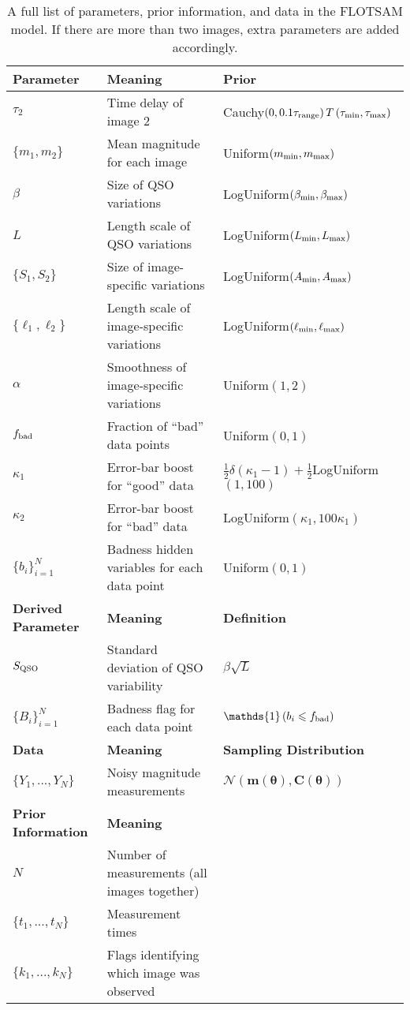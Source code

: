 \documentclass[useAMS,usenatbib, a4paper]{mn2e} \usepackage{natbib}
\newcommand{\params}{\boldsymbol{\theta}}
\begin{document}
\begin{table*}
\begin{tabular}{lll}
\hline
{\bf Parameter} &	{\bf Meaning}			& {\bf Prior}\\
\hline
$\tau_2$	&	Time delay of image 2	&	Cauchy$\left(0, 0.1\tau_{\rm range}\right)T\left(\tau_{\rm min},\tau_{\rm max}\right)$\\
$\{m_1, m_2\}$	&	Mean magnitude for each image	& Uniform$(m_{\rm min}, m_{\rm max})$\\
$\beta$		&	Size of QSO variations		& LogUniform$(\beta_{\rm min}, \beta_{\rm max})$\\
$L$		&	Length scale of QSO variations	& LogUniform$(L_{\rm min}, L_{\rm max})$\\
$\{S_1, S_2\}$	&	Size of image-specific variations	& LogUniform$\left(A_{\rm min}, A_{\rm max}\right)$\\
$\{\ell_1, \ell_2\}$ &	Length scale of image-specific variations & LogUniform$(\ell_{\rm min}, \ell_{\rm max})$\\
$\alpha$	&	Smoothness of image-specific variations	& Uniform$(1, 2)$\\
$f_{\rm bad}$	&	Fraction of ``bad'' data points	& Uniform$(0,1)$\\
$\kappa_1$	&	Error-bar boost for ``good'' data & $\frac{1}{2}\delta(\kappa_1 - 1) + \frac{1}{2}$LogUniform$(1,100)$\\
$\kappa_2$	&	Error-bar boost for ``bad'' data & LogUniform$(\kappa_1, 100\kappa_1)$\\
$\{b_i\}_{i=1}^N$ &	Badness hidden variables for each data point & Uniform$(0,1)$\\
\hline
{\bf Derived Parameter} & {\bf Meaning}	&	{\bf Definition}\\
\hline
$S_{\rm QSO}$	&	Standard deviation of QSO variability	& $\beta\sqrt{L}$\\
$\{B_i\}_{i=1}^N$	&	Badness flag for each data point & $\mathds{1}\left(b_i \leq f_{\rm bad}\right)$\\
\hline
{\bf Data}	&	{\bf Meaning}			& {\bf Sampling Distribution}\\
\hline
$\{Y_1, ..., Y_N\}$ &	Noisy magnitude measurements	& $\mathcal{N}\left(\mathbf{m}(\params), \mathbf{C}(\params)\right)$\\
\hline
{\bf Prior Information} & {\bf Meaning}			&\\
\hline
$N$		&	Number of measurements (all images together)\\
$\{t_1, ..., t_N\}$ &	Measurement times\\
$\{k_1, ..., k_N\}$ &	Flags identifying which image was observed
\end{tabular}
\caption{A full list of parameters, prior information, and data in the
FLOTSAM model. If there are more than two images, extra parameters are
added accordingly.\label{tab:prior}}
\end{table*}
\end{document}
